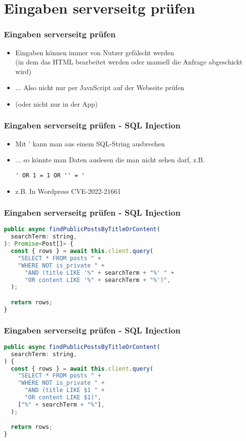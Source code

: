 \documentclass[ngerman2]{beamer}
\begin{document}
\section{Eingaben serverseitg prüfen}

\begin{frame}[fragile]
\frametitle{Eingaben serverseitg prüfen}
  \begin{itemize}
    \item Eingaben können immer von Nutzer gefälscht werden\\
			(in dem das HTML bearbeitet werden oder manuell die Anfrage abgeschickt wird)
		\item ... Also nicht nur per JavaScript auf der Webseite prüfen
    \item (oder nicht nur in der App)
  \end{itemize}
\end{frame}

\begin{frame}[fragile]
\frametitle{Eingaben serverseitg prüfen - SQL Injection}
  \begin{itemize}
    \item Mit ' kann man aus einem SQL-String ausbrechen
		\item ... so könnte man Daten auslesen die man nicht sehen darf, z.B.
			\begin{lstlisting}
' OR 1 = 1 OR '' = '
			\end{lstlisting}
    \item z.B. In Wordpress CVE-2022-21661 \cite{CVE202221661}
  \end{itemize}
\end{frame}

\begin{frame}[fragile]
\frametitle{Eingaben serverseitg prüfen - SQL Injection}
  \begin{lstlisting}[language=JavaScript]
public async findPublicPostsByTitleOrContent(
  searchTerm: string,
): Promise<Post[]> {
  const { rows } = await this.client.query(
    "SELECT * FROM posts " +
    "WHERE NOT is_private " +
      "AND (title LIKE '%" + searchTerm + "%' " +
      "OR content LIKE '%" + searchTerm + "%')",
  );

  return rows;
}
  \end{lstlisting}
\end{frame}

\begin{frame}[fragile]
\frametitle{Eingaben serverseitg prüfen - SQL Injection}
  \begin{lstlisting}[language=JavaScript]
public async findPublicPostsByTitleOrContent(
  searchTerm: string,
) {
  const { rows } = await this.client.query(
    "SELECT * FROM posts " +
    "WHERE NOT is_private " +
      "AND (title LIKE $1 " +
      "OR content LIKE $1)",
    ["%" + searchTerm + "%"],
  );

  return rows;
}
  \end{lstlisting}
\end{frame}
\end{document}
